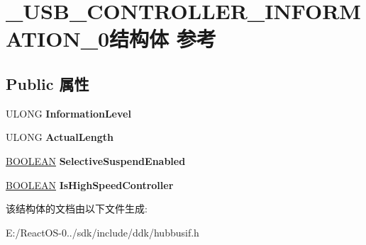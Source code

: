 \hypertarget{struct___u_s_b___c_o_n_t_r_o_l_l_e_r___i_n_f_o_r_m_a_t_i_o_n__0}{}\section{\+\_\+\+U\+S\+B\+\_\+\+C\+O\+N\+T\+R\+O\+L\+L\+E\+R\+\_\+\+I\+N\+F\+O\+R\+M\+A\+T\+I\+O\+N\+\_\+0结构体 参考}
\label{struct___u_s_b___c_o_n_t_r_o_l_l_e_r___i_n_f_o_r_m_a_t_i_o_n__0}
\subsection*{Public 属性}
\begin{DoxyCompactItemize}
\item 
\mbox{\label{struct___u_s_b___c_o_n_t_r_o_l_l_e_r___i_n_f_o_r_m_a_t_i_o_n__0_a2bef098cfb30a6967c06a0e229162841}} 
U\+L\+O\+NG {\bfseries Information\+Level}
\item 
\mbox{\label{struct___u_s_b___c_o_n_t_r_o_l_l_e_r___i_n_f_o_r_m_a_t_i_o_n__0_a2daa6bf031b14565d626d72086cf02f7}} 
U\+L\+O\+NG {\bfseries Actual\+Length}
\item 
\mbox{\label{struct___u_s_b___c_o_n_t_r_o_l_l_e_r___i_n_f_o_r_m_a_t_i_o_n__0_af257f858062c3de01988738b66d113eb}} 
\hyperlink{_processor_bind_8h_a112e3146cb38b6ee95e64d85842e380a}{B\+O\+O\+L\+E\+AN} {\bfseries Selective\+Suspend\+Enabled}
\item 
\mbox{\label{struct___u_s_b___c_o_n_t_r_o_l_l_e_r___i_n_f_o_r_m_a_t_i_o_n__0_a794fc533f33b1f2684bed2f207f77c5f}} 
\hyperlink{_processor_bind_8h_a112e3146cb38b6ee95e64d85842e380a}{B\+O\+O\+L\+E\+AN} {\bfseries Is\+High\+Speed\+Controller}
\end{DoxyCompactItemize}


该结构体的文档由以下文件生成\+:\begin{DoxyCompactItemize}
\item 
E\+:/\+React\+O\+S-\/0../sdk/include/ddk/hubbusif.\+h\end{DoxyCompactItemize}
